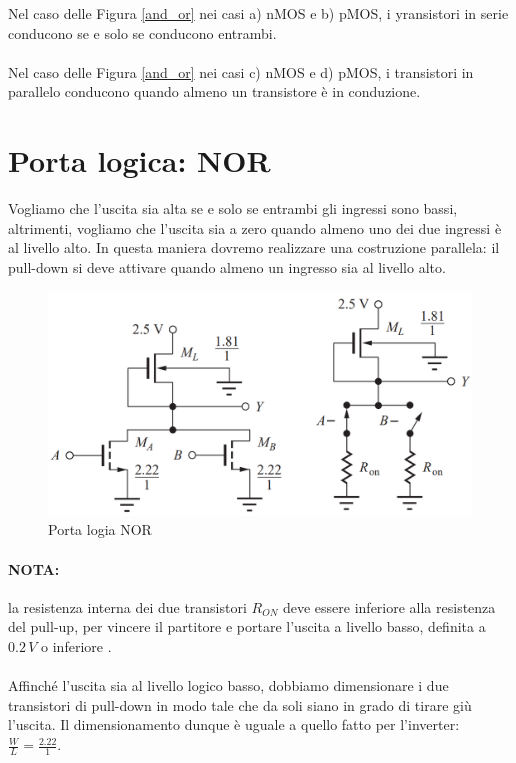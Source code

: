 Nel caso delle Figura \ref{and_or} nei casi a) nMOS e b) pMOS, i yransistori	in	serie	conducono	
se	e	solo	se	conducono	entrambi.
\paragraph{}
Nel caso delle Figura \ref{and_or} nei casi c) nMOS e d) pMOS, i transistori	in	parallelo	conducono	quando almeno un transistore è in conduzione.


\newpage
\section{Porta logica: NOR}

Vogliamo che l'uscita sia alta se e solo se entrambi gli ingressi sono bassi, altrimenti, vogliamo che l'uscita sia a zero quando almeno uno dei due ingressi è al livello alto. In questa maniera dovremo realizzare una costruzione parallela: il pull-down si deve attivare quando almeno un ingresso sia al livello alto.


\begin{figure}[htbp]
    \centering
    \includegraphics[width=0.5\linewidth]{img/NOR.png}
    \caption{Porta logia NOR}    
\end{figure}

\paragraph{NOTA: } la resistenza interna dei due transistori $R_{ON}$ deve essere inferiore alla resistenza del pull-up, per vincere il partitore e portare l'uscita a livello basso, definita a $0.2\,V$ o inferiore .
\paragraph{}

Affinché l'uscita sia al livello logico basso, dobbiamo dimensionare i due transistori di pull-down in modo tale che da soli siano in grado di tirare giù l'uscita. Il dimensionamento dunque è uguale a quello fatto per l'inverter: $\frac{W}{L} = \frac{2.22}{1}$.

